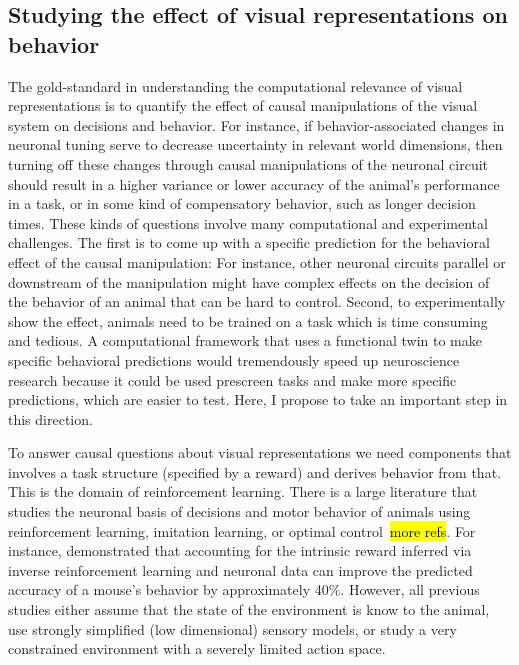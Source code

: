 \documentclass[B2,COG]{ercgrant}
\begin{document}

\subsection{Studying the effect of visual representations on behavior}
The gold-standard in understanding the computational relevance of visual representations  is to quantify the effect of causal manipulations of the visual system on decisions and behavior. 
For instance, if behavior-associated changes in neuronal tuning serve to decrease uncertainty in relevant world dimensions, then turning off these changes through causal manipulations of the neuronal circuit should result in a higher variance or lower accuracy of the animal's performance in a task, or in some kind of compensatory behavior, such as longer decision times.
These kinds of questions involve many computational and experimental challenges. 
The first is to come up with a specific prediction for the behavioral effect of the causal manipulation: For instance, other neuronal circuits parallel or downstream of the manipulation might have complex effects on the decision of the behavior of an animal that can be hard to control. 
Second, to experimentally show the effect, animals need to be trained on a task which is time consuming and tedious. 
A computational framework that uses a functional twin to make specific behavioral predictions would tremendously speed up neuroscience research because it could be used prescreen tasks and make more specific predictions, which are easier to test. 
Here, I propose to take an important step in this direction. 

To answer causal questions about visual representations we need components that involves a task structure (\eg specified by a reward) and derives behavior from that. 
This is the domain of reinforcement learning.
There is a large literature that studies the neuronal basis of decisions and motor behavior of animals using reinforcement learning, imitation learning, or optimal control~\parencite{Schultz1997-xu,Todorov2004-yb}\hl{more refs}.
For instance, \textcite{Kalweit2022-ev} demonstrated that accounting for the intrinsic reward inferred via inverse reinforcement learning and neuronal data can improve the predicted accuracy of a mouse's behavior by approximately 40\%.
However, all previous studies either assume that the state of the environment is know to the animal, use strongly simplified (low dimensional) sensory models, or study a very constrained environment with a severely limited action space. 
\end{document}
